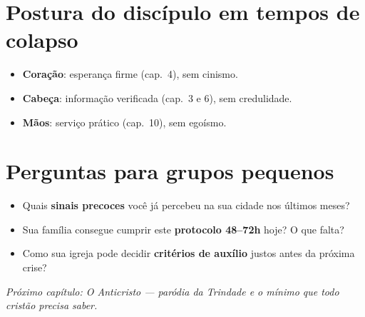\section{Postura do discípulo em tempos de colapso}
\begin{itemize}[leftmargin=*,noitemsep]
  \item \textbf{Coração}: esperança firme (cap.~4), sem cinismo.
  \item \textbf{Cabeça}: informação verificada (cap.~3 e 6), sem credulidade.
  \item \textbf{Mãos}: serviço prático (cap.~10), sem egoísmo.
\end{itemize}

\section{Perguntas para grupos pequenos}
\begin{itemize}[leftmargin=*,noitemsep]
  \item Quais \textbf{sinais precoces} você já percebeu na sua cidade nos últimos meses?
  \item Sua família consegue cumprir este \textbf{protocolo 48--72h} hoje? O que falta?
  \item Como sua igreja pode decidir \textbf{critérios de auxílio} justos antes da próxima crise?
\end{itemize}

\bigskip
\noindent\textit{Próximo capítulo: O Anticristo --- paródia da Trindade e o mínimo que todo cristão precisa saber.}
